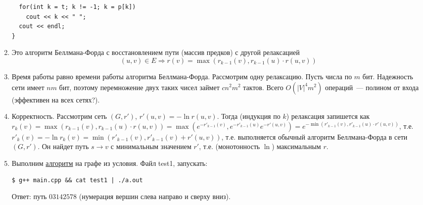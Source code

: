 \documentclass[a4paper]{article}
\begin{document}
\begin{enumerate}
\begin{lstlisting}
  for(int k = t; k != -1; k = p[k])
    cout << k << " ";
  cout << endl;
}
\end{lstlisting}
\item Это алгоритм Беллмана-Форда с восстановлением пути (массив предков) с другой релаксацией $$(u,v)\in E\Rightarrow r(v)=\max (r_{k-1}(v),r_{k-1}(u)\cdot r(u,v))$$
\item Время работы равно времени работы алгоритма Беллмана-Форда. Рассмотрим одну релаксацию. Пусть числа по $m$ бит. Надежность сети имеет $nm$ бит, поэтому перемножение двух таких чисел займет $cn^2m^2$ тактов. Всего $O(|V|^4m^2)$ операций~--- полином от входа (эффективен на всех сетях?).
\item Корректность. Рассмотрим сеть $(G,r')$, $r'(u,v)=-\ln r(u,v)$. Тогда (индукция по $k$) релаксация запишется как $r_k(v)=\max (r_{k-1}(v),r_{k-1}(u)\cdot r(u,v))=\max (e^{-r'_{k-1}(v)},e^{-r'_{k-1}(u)}e^{-r'(u,v)})=e^{-\min(r'_{k-1}(v),r'_{k-1}(u)\cdot r'(u,v))}$, т.е. $r'_k(v)=-\ln r_k(v)=\min(r'_{k-1}(v),r'_{k-1}(v)+ r'(u,v))$, т.е. выполняется обычный алгоритм Беллмана-Форда в сети $(G,r')$. Он найдет путь $s\to v$ с минимальным значением $r'$, т.е. (монотонность $\ln$) максимальным $r$.
\item Выполним \href{https://bitbucket.org/etoestja/inf/raw/HEAD/mipt/s4/AACM/C/51/main.cpp}{алгоритм} на графе из условия. Файл test1, запускать: \begin{verbatim}
$ g++ main.cpp && cat test1 | ./a.out \end{verbatim}
Ответ: путь $0 3 1 4 2 5 7 8$ (нумерация вершин слева направо и сверху вниз).\newline
{}
\end{enumerate}
\end{document}
